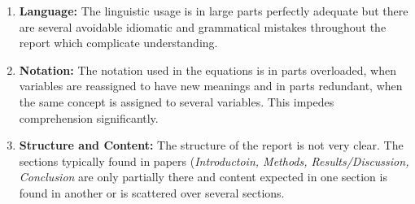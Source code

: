 \documentclass[../review.tex]{subfiles}
\begin{document}
 \textcolor{green}{\Large\checkmark}
\begin{enumerate}
 \item \textbf{Language:} The linguistic usage is in large parts perfectly adequate but there are several avoidable idiomatic and grammatical mistakes throughout the report which complicate understanding.
 \item \textbf{Notation:} The notation used in the equations is in parts overloaded, when variables are reassigned to have new meanings and in parts redundant, when the same concept is assigned to several variables. This impedes comprehension significantly.
 \item \textbf{Structure and Content:} The structure of the report is not very clear. The sections typically found in papers (\textit{Introductoin, Methods, Results/Discussion, Conclusion} are only partially there and content expected in one section is found in another or is scattered over several sections.
\end{enumerate}
\end{document}
